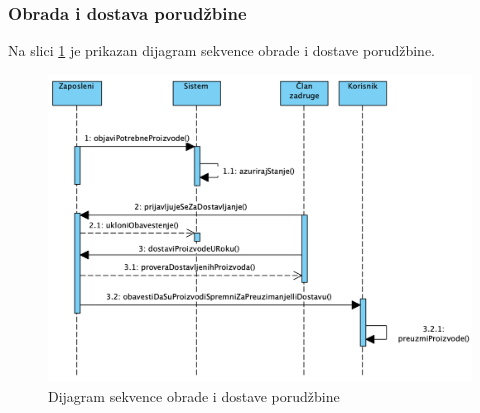 \documentclass[a4paper]{article}
\begin{document}
\subsubsection{Obrada i dostava porudžbine}

Na slici \ref{dsekv_obrada_dostava} je prikazan dijagram sekvence obrade i dostave porudžbine.
\begin{figure}[h!]
    \centering
    \includegraphics[scale=0.6]{images/dsekv_obrada_dostava.png}
    \caption{Dijagram sekvence obrade i dostave porudžbine}
    \label{dsekv_obrada_dostava}
\end{figure}
\clearpage
\end{document}
